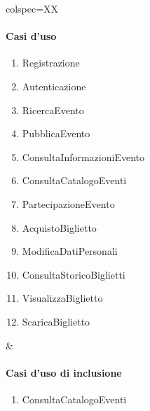 \begin{table}[!hbp]
	\centering
	\begin{tblr}{colspec=XX}
		\begin{minipage}[t]{\linewidth}
			\paragraph{Casi d'uso}
			\begin{enumerate}[leftmargin=*]
				\item Registrazione 
				\item Autenticazione
				\item RicercaEvento
				\item PubblicaEvento
				\item ConsultaInformazioniEvento
				\item ConsultaCatalogoEventi
				\item PartecipazioneEvento
				\item AcquistoBiglietto
				\item ModificaDatiPersonali
				\item ConsultaStoricoBiglietti
				\item VisualizzaBiglietto
				\item ScaricaBiglietto
			\end{enumerate}
		\end{minipage} &
		\begin{minipage}[t]{\linewidth}
			\paragraph{Casi d'uso di inclusione}
			\begin{enumerate}[leftmargin=*]
                \item ConsultaCatalogoEventi
			\end{enumerate}

		\end{minipage}
	\end{tblr}
\end{table}
